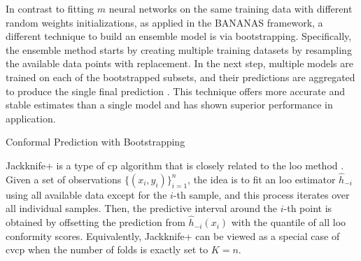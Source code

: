 In contrast to fitting $m$ neural networks on the same training data with different random weights initializations, as applied in the BANANAS framework, a different technique to build an ensemble model is via bootstrapping. Specifically, the ensemble method starts by creating multiple training datasets by resampling the available data points with replacement. In the next step, multiple models are trained on each of the bootstrapped subsets, and their predictions are aggregated to produce the single final prediction \cite{breiman96}. This technique offers more accurate and stable estimates than a single model and has shown superior performance in application.

\begin{algorithm}[t]
  \caption{Conformal Prediction with Bootstrapping}
  \label{alg:BtCP}
  \begin{algorithmic}[1]
    \textbf{Input:} 
    A set of observations $\{(x_{i}, y_{i})\}_{i=1}^n$, number of bootstraps $B$, a prediction algorithm $h(\cdot)$, a non-conformity measure $\myfunc{s(\cdot)}$, nominal mis-coverage rate $\tau$, test data $x_{n+1}$. \vskip
    \textbf{Output:} a prediction set $\mathcal{C}_{\tau}(x_{n+1})}$ that covers $y_{n+1}$ with probability $1-\tau$. \vskip
    \vspace{0.5em}
    \STATE Sample all available data with replacement and create $B$ subsets. $I_b$ denotes the indices of data points included in the $b$-th sample.
    \STATE Train $\hat{h}_{b}(\cdot)$ on $\{(x_{i}, y_{i}) \mid i \in I_b\}$ for $b$ in 1, 2, ..., B
    \STATE Initialise a conformity scoring set $S=\emptyset$
    \FOR {$i$ in 1, 2, ..., n}
    	\begin{enumerate}
    		\STATE Initialize an empty for leave-one-out estimates $LOO_i=\emptyset$
    		\STATE For {$b$ in 1, 2, ..., B},  if {$i$ \notin \; $I_b$}\;: $LOO_i \leftarrow{LOO_i \cup \hat{h}_b(x_i)}$ 
			\STATE S \gets S \cup s\big(aggregate(LOO_i),\; y_i\big)
		\end{enumerate}
    \ENDFOR
	\STATE Predict $x_{n+1}$: $h(x_{n+1}) \leftarrow aggregate(\{\hat{h}_{1}(x_{n+1}), ..., \hat{h}_{B}(x_{n+1})\})$ 
	\STATE Return $\mathcal{C}_{\tau}(x_{n+1}) \leftarrow \{y \,|\, s((h(x_{n+1}), y) \leq q\}$, where $q$ is the $\lceil(1-\tau)(n_s+1)\rceil$-th smallest value of $S$, with $n_s = |S|$.
    \end{algorithmic}
\end{algorithm}

Jackknife+ is a type of \gls{cp} algorithm that is closely related to the \gls{loo} method \cite{barber2020jackknife}. Given a set of observations $\{(x_{i}, y_{i})\}_{i=1}^n$, the idea is to fit an \gls{loo} estimator $\hat{h}_{-i}$ using all available data except for the $i$-th sample, and this process iterates over all individual samples. Then, the predictive interval around the $i$-th point is obtained by offsetting the prediction from $\hat{h}_{-i}(x_i)$ with the quantile of all \gls{loo} conformity scores.  Equivalently, Jackknife+ can be viewed as a special case of \gls{cvcp} when the number of folds is exactly set to $K=n$.

